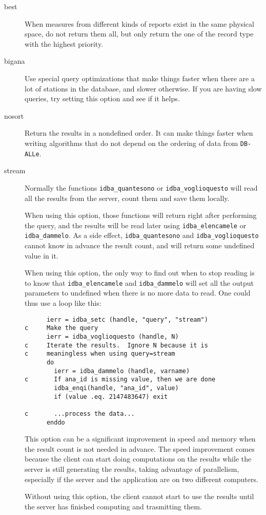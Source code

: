 \documentclass[final,12pt,a4paper,twoside]{book}
\newcommand{\dballe}{{\tt DB-ALLe}}
\begin{document}
\begin{description}
\item [best]
  When measures from different kinds of reports exist in the same physical
  space, do not return them all, but only return the one of the record type
  with the highest priority.
\item [bigana]
  Use special query optimizations that make things faster when there are a lot
  of stations in the database, and slower otherwise.  If you are having slow
  queries, try setting this option and see if it helps.
\item [nosort]
  Return the results in a nondefined order.  It can make things faster when
  writing algorithms that do not depend on the ordering of data from \dballe{}.
\item [stream]
  Normally the functions {\tt idba\_quantesono} or {\tt idba\_voglioquesto}
  will read all the results from the server, count them and save them locally.

  When using this option, those functions will return right after performing
  the query, and the results will be read later using {\tt idba\_elencamele} or
  {\tt idba\_dammelo}.  As a side effect, {\tt idba\_quantesono} and
  {\tt idba\_voglioquesto} cannot know in advance the result count, and will
  return some undefined value in it.

  When using this option, the only way to find out when to stop reading is to
  know that {\tt idba\_elencamele} and {\tt idba\_dammelo} will set all the
  output parameters to undefined when there is no more data to read.  One could
  thus use a loop like this:
  \begin{verbatim}
      ierr = idba_setc (handle, "query", "stream")
c     Make the query
      ierr = idba_voglioquesto (handle, N)
c     Iterate the results.  Ignore N because it is
c     meaningless when using query=stream
      do
        ierr = idba_dammelo (handle, varname)
c       If ana_id is missing value, then we are done
        idba_enqi(handle, "ana_id", value)
        if (value .eq. 2147483647) exit

c       ...process the data...
      enddo
  \end{verbatim}

  This option can be a significant improvement in speed and memory when the
  result count is not needed in advance.  The speed improvement comes because
  the client can start doing computations on the results while the server is
  still generating the results, taking advantage of parallelism, especially if
  the server and the application are on two different computers.

  Without using this option, the client cannot start to use the results until
  the server has finished computing and trasmitting them.
\end{description}
\end{document}
